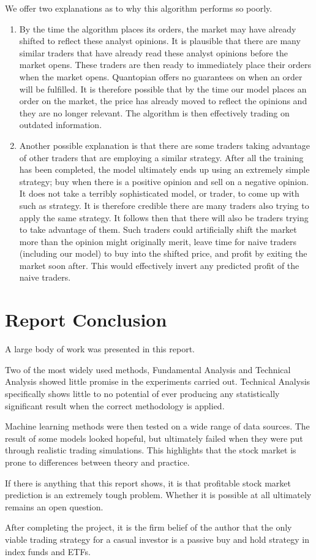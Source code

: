 \documentclass{report}
\begin{document}
We offer two explanations as to why this algorithm performs so poorly. 
\begin{enumerate}
  \item By the time the algorithm places its orders, the market may have already shifted to reflect these analyst opinions. It is plausible that there are many similar traders that have already read these analyst opinions before the market opens. These traders are then ready to immediately place their orders when the market opens. Quantopian offers no guarantees on when an order will be fulfilled. It is therefore possible that by the time our model places an order on the market, the price has already moved to reflect the opinions and they are no longer relevant. The algorithm is then effectively trading on outdated information.
  
  \item Another possible explanation is that there are some traders taking advantage of other traders that are employing a similar strategy. After all the training has been completed, the model ultimately ends up using an extremely simple strategy; buy when there is a positive opinion and sell on a negative opinion. It does not take a terribly sophisticated model, or trader, to come up with such as strategy. It is therefore credible there are many traders also trying to apply the same strategy. It follows then that there will also be traders trying to take advantage of them. Such traders could artificially shift the market more than the opinion might originally merit, leave time for naive traders (including our model) to buy into the shifted price, and profit by exiting the market soon after. This would effectively invert any predicted profit of the naive traders.
\end{enumerate}

\chapter{Report Conclusion}

A large body of work was presented in this report. 

Two of the most widely used methods, Fundamental Analysis and Technical Analysis showed little promise in the experiments carried out. Technical Analysis specifically shows little to no potential of ever producing any statistically significant result when the correct methodology is applied.

Machine learning methods were then tested on a wide range of data sources. The result of some models looked hopeful, but ultimately failed when they were put through realistic trading simulations. This highlights that the stock market is prone to differences between theory and practice.

If there is anything that this report shows, it is that profitable stock market prediction is an extremely tough problem. Whether it is possible at all ultimately remains an open question. 

After completing the project, it is the firm belief of the author that the only viable trading strategy for a casual investor is a passive buy and hold strategy in index funds and ETFs.



\end{document}
